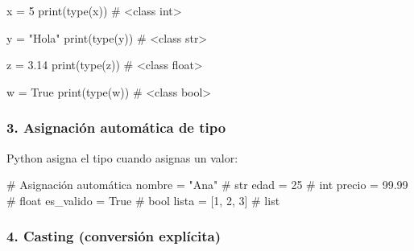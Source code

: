 \documentclass[
  doc,
  floatsintext,
  longtable,
  a4paper,
  nolmodern,
  notxfonts,
  notimes,
  12pt,
  colorlinks=true,linkcolor=blue,citecolor=blue,urlcolor=blue]{apa7}
\newenvironment{Shaded}{\begin{snugshade}}{\end{snugshade}}
\newcommand{\BuiltInTok}[1]{\textcolor[rgb]{0.00,0.23,0.31}{#1}}
\newcommand{\CommentTok}[1]{\textcolor[rgb]{0.37,0.37,0.37}{#1}}
\newcommand{\DecValTok}[1]{\textcolor[rgb]{0.68,0.00,0.00}{#1}}
\newcommand{\FloatTok}[1]{\textcolor[rgb]{0.68,0.00,0.00}{#1}}
\newcommand{\NormalTok}[1]{\textcolor[rgb]{0.00,0.23,0.31}{#1}}
\newcommand{\OperatorTok}[1]{\textcolor[rgb]{0.37,0.37,0.37}{#1}}
\newcommand{\StringTok}[1]{\textcolor[rgb]{0.13,0.47,0.30}{#1}}
\newcommand{\VariableTok}[1]{\textcolor[rgb]{0.07,0.07,0.07}{#1}}
\begin{document}
\begin{Shaded}
\begin{Highlighting}[]
\NormalTok{x }\OperatorTok{=} \DecValTok{5}
\BuiltInTok{print}\NormalTok{(}\BuiltInTok{type}\NormalTok{(x))  }\CommentTok{\# \textless{}class \textquotesingle{}int\textquotesingle{}\textgreater{}}

\NormalTok{y }\OperatorTok{=} \StringTok{"Hola"}
\BuiltInTok{print}\NormalTok{(}\BuiltInTok{type}\NormalTok{(y))  }\CommentTok{\# \textless{}class \textquotesingle{}str\textquotesingle{}\textgreater{}}

\NormalTok{z }\OperatorTok{=} \FloatTok{3.14}
\BuiltInTok{print}\NormalTok{(}\BuiltInTok{type}\NormalTok{(z))  }\CommentTok{\# \textless{}class \textquotesingle{}float\textquotesingle{}\textgreater{}}

\NormalTok{w }\OperatorTok{=} \VariableTok{True}
\BuiltInTok{print}\NormalTok{(}\BuiltInTok{type}\NormalTok{(w))  }\CommentTok{\# \textless{}class \textquotesingle{}bool\textquotesingle{}\textgreater{}}
\end{Highlighting}
\end{Shaded}

\subsubsection{3. Asignación automática de
tipo}\label{asignaciuxf3n-automuxe1tica-de-tipo}

Python asigna el tipo cuando asignas un valor:

\begin{Shaded}
\begin{Highlighting}[]
\CommentTok{\# Asignación automática}
\NormalTok{nombre }\OperatorTok{=} \StringTok{"Ana"}        \CommentTok{\# str}
\NormalTok{edad }\OperatorTok{=} \DecValTok{25}             \CommentTok{\# int}
\NormalTok{precio }\OperatorTok{=} \FloatTok{99.99}        \CommentTok{\# float}
\NormalTok{es\_valido }\OperatorTok{=} \VariableTok{True}      \CommentTok{\# bool}
\NormalTok{lista }\OperatorTok{=}\NormalTok{ [}\DecValTok{1}\NormalTok{, }\DecValTok{2}\NormalTok{, }\DecValTok{3}\NormalTok{]     }\CommentTok{\# list}
\end{Highlighting}
\end{Shaded}

\subsubsection{4. Casting (conversión
explícita)}\label{casting-conversiuxf3n-expluxedcita}
\end{document}

